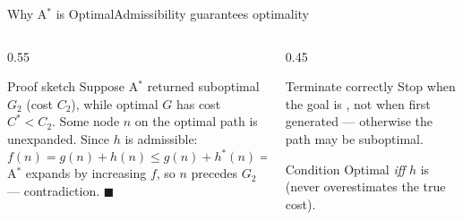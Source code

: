 \documentclass[aspectratio=169,11pt]{beamer}
\begin{document}
\begin{frame}{Why A$^\ast$ is Optimal}{Admissibility guarantees optimality}
  \begin{columns}[T]
    \begin{column}{0.55\textwidth}
      \begin{block}{Proof sketch}
        \small
        Suppose A$^\ast$ returned suboptimal $G_2$ (cost $C_2$), while optimal $G$
        has cost $C^{\ast} < C_2$. Some node $n$ on the optimal path is unexpanded.
        Since $h$ is admissible:
        \[ f(n) = g(n)+h(n) \le g(n)+h^{\ast}(n) = C^{\ast} < C_2 = f(G_2). \]
        A$^\ast$ expands by increasing $f$, so $n$ precedes $G_2$ — contradiction. $\blacksquare$
      \end{block}
    \end{column}
    \begin{column}{0.45\textwidth}
      \begin{alertblock}{Terminate correctly}
        \small Stop when the goal is ,
        not when first generated — otherwise the path may be suboptimal.
      \end{alertblock}
      \begin{block}{Condition}
        \small Optimal \emph{iff} $h$ is 
        (never overestimates the true cost).
      \end{block}
    \end{column}
  \end{columns}
\end{frame}
\end{document}
